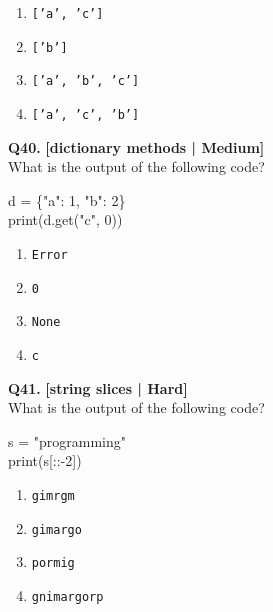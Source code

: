 \begin{enumerate}[label=(\alph*),topsep=2pt,itemsep=1pt,partopsep=0pt,parsep=0pt]
    \item \relax \texttt{['a', 'c']}
    \item \relax \texttt{['b']}
    \item \relax \texttt{['a', 'b', 'c']}
    \item \relax \texttt{['a', 'c', 'b']}
\end{enumerate}
\vspace{2mm}

\noindent\textbf{Q40.} \hfill {\small\color{LPUOrange}\textbf{[dictionary methods | Medium]}}\\[2pt]
What is the output of the following code? 

\begin{pycode}
d = \{"a": 1, "b": 2\}\\
print(d.get("c", 0))
\end{pycode}

\begin{enumerate}[label=(\alph*),topsep=2pt,itemsep=1pt,partopsep=0pt,parsep=0pt]
    \item \relax \texttt{Error}
    \item \relax \texttt{0}
    \item \relax \texttt{None}
    \item \relax \texttt{c}
\end{enumerate}
\vspace{2mm}

\noindent\textbf{Q41.} \hfill {\small\color{LPUOrange}\textbf{[string slices | Hard]}}\\[2pt]
What is the output of the following code? 

\begin{pycode}
s = "programming"\\
print(s[::-2])
\end{pycode}

\begin{enumerate}[label=(\alph*),topsep=2pt,itemsep=1pt,partopsep=0pt,parsep=0pt]
    \item \relax \texttt{gimrgm}
    \item \relax \texttt{gimargo}
    \item \relax \texttt{pormig}
    \item \relax \texttt{gnimargorp}
\end{enumerate}
\vspace{2mm}

